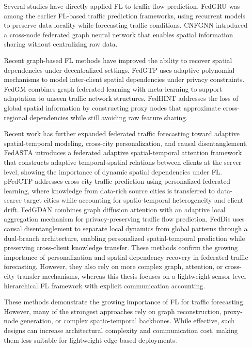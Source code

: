 Several studies have directly applied FL to traffic flow prediction. FedGRU \cite{liu2020fedgru} was among the earlier FL-based traffic prediction frameworks, using recurrent models to preserve data locality while forecasting traffic conditions. CNFGNN \cite{meng2021cnfgnn} introduced a cross-node federated graph neural network that enables spatial information sharing without centralizing raw data.

Recent graph-based FL methods have improved the ability to recover spatial dependencies under decentralized settings. FedGTP \cite{yang2024fedgtp} uses adaptive polynomial mechanisms to model inter-client spatial dependencies under privacy constraints. FedGM \cite{wang2024fedgm} combines graph federated learning with meta-learning to support adaptation to unseen traffic network structures. FedHINT \cite{zhou2026fedhint} addresses the loss of global spatial information by constructing proxy nodes that approximate cross-regional dependencies while still avoiding raw feature sharing.

Recent work has further expanded federated traffic forecasting toward adaptive spatial-temporal modeling, cross-city personalization, and causal disentanglement. FedASTA \cite{chen2024fedasta} introduces a federated adaptive spatial-temporal attention framework that constructs adaptive temporal-spatial relations between clients at the server level, showing the importance of dynamic spatial dependencies under FL. pFedCTP \cite{zhang2024pfedctp} addresses cross-city traffic prediction using personalized federated learning, where knowledge from data-rich source cities is transferred to data-scarce target cities while accounting for spatio-temporal heterogeneity and client drift. FedGDAN \cite{li2025fedgdan} combines graph diffusion attention with an adaptive local aggregation mechanism for privacy-preserving traffic flow prediction. FedDis \cite{zhou2026feddis} uses causal disentanglement to separate local dynamics from global patterns through a dual-branch architecture, enabling personalized spatial-temporal prediction while preserving cross-client knowledge transfer. These methods confirm the growing importance of personalization and spatial dependency recovery in federated traffic forecasting. However, they also rely on more complex graph, attention, or cross-city transfer mechanisms, whereas this thesis focuses on a lightweight sensor-level hierarchical FL framework with explicit communication accounting.

These methods demonstrate the growing importance of FL for traffic forecasting. However, many of the strongest approaches rely on graph reconstruction, proxy-node generation, or complex spatio-temporal backbones. While effective, such designs can increase architectural complexity and communication cost, making them less suitable for lightweight edge-based deployments.

